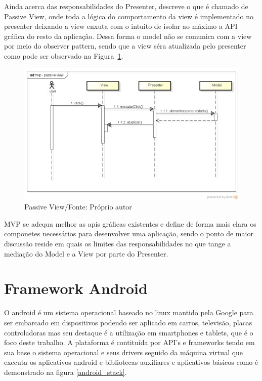 Ainda acerca das responsabilidades do Presenter,  descreve
o que é chamado de Passive View, onde toda a lógica do comportamento da view é
implementado no presenter deixando a view enxuta com o intuito de isolar ao
máximo a API gráfica do resto da aplicação. Dessa forma o model não se comunica
com a view por meio do observer pattern, sendo que a view séra atualizada pelo
presenter como pode ser observado na Figura~\ref{fig:mvp_passive_view}.

\begin{figure}[h]
	\centering
	\includegraphics[scale=0.5]{img/mvp_passive_view.png}
	\caption{Passive View/Fonte: Próprio autor}
	\label{fig:mvp_passive_view}
\end{figure}

MVP se adequa melhor as apis gráficas existentes e define de forma mais clara os
componetes necessários para desenvolver uma aplicação, sendo o ponto de maior
discussão reside em quais os limites das responsabilidades no que tange a
mediação do Model e a View por parte do Presenter.

\section{Framework Android}
 

O android é um sistema operacional baseado no linux mantido pela Google para
ser embarcado em dispositivos podendo ser aplicado em carros, televisão, placas
controladoras mas seu destaque é a utilização em smartphones e
tablets, que é o foco deste trabalho. A plataforma é contituída por API's e
frameworks tendo em sua base o sistema operacional e seus drivers seguido da
máquina virtual que executa os aplicativos android e bibliotecas auxiliares e
aplicativos básicos como é demonstrado na figura \ref{android_stack}.

